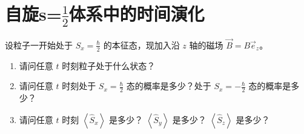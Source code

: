 \documentclass[lang=cn,10pt]{elegantbook}
\begin{document}
\section{自旋s=$\frac{1}{2}$体系中的时间演化}
\begin{example}
	设粒子一开始处于 $S_x = \frac{\hbar}{2}$ 的本征态，现加入沿 $z$ 轴的磁场 $\vec{B} = B \vec{e}_z$。
	
	\begin{enumerate}
		\item 请问任意 $t$ 时刻粒子处于什么状态？
		\item 请问任意 $t$ 时刻处于 $S_x = \frac{\hbar}{2}$ 态的概率是多少？处于 $S_x = -\frac{\hbar}{2}$ 态的概率是多少？
		\item 请问任意 $t$ 时刻 $\left\langle \hat{S}_x \right\rangle$ 是多少？ $\left\langle \hat{S}_y \right\rangle$ 是多少？ $\left\langle \hat{S}_z \right\rangle$ 是多少？
	\end{enumerate}
\end{example}
\end{document}
